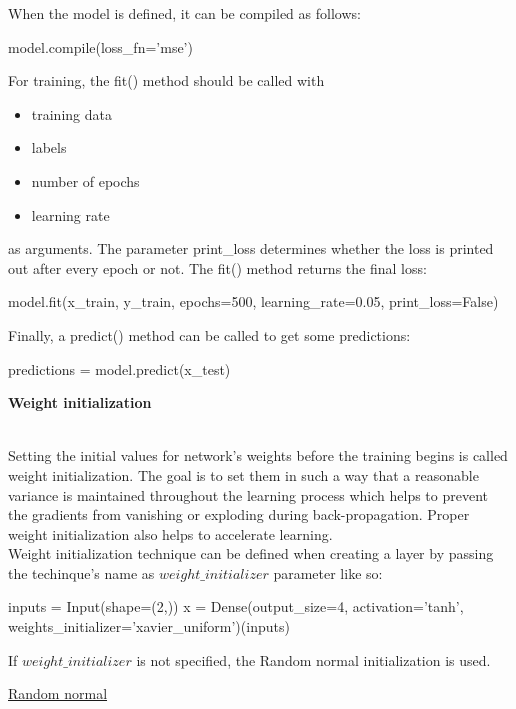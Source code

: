 \documentclass{article}
\begin{document}
When the model is defined, it can be compiled as follows:
\begin{python}
model.compile(loss_fn='mse')
\end{python}

For training, the fit() method should be called with 
\begin{itemize}
    \item training data
    \item labels 
    \item number of epochs
    \item learning rate
\end{itemize}
as arguments. The parameter print\_loss determines whether the loss is printed out 
after every epoch or not. The fit() method returns the final loss:
\begin{python}
model.fit(x_train,
          y_train,
          epochs=500,
          learning_rate=0.05,
          print_loss=False)
\end{python}
Finally, a predict() method can be called to get some predictions:
\begin{python}
predictions = model.predict(x_test)
\end{python}
    \clearpage
    
\hypertarget{weight_initialization}{\textbf{Weight initialization}} \\

Setting the initial values for network's weights before the training begins is called weight 
initialization. The goal is to set them in such a way that a reasonable variance is maintained throughout 
the learning process which helps to prevent the gradients from vanishing or exploding during back-propagation. 
Proper weight initialization also helps to accelerate learning. \\

Weight initialization technique can be defined when creating a layer by passing 
the techinque's name as $weight\_initializer$ parameter like so:
\begin{python}
inputs = Input(shape=(2,))
x = Dense(output_size=4,
          activation='tanh',
          weights_initializer='xavier_uniform')(inputs)
\end{python}

If $weight\_initializer$ is not specified, the Random normal initialization is used.
\pagebreak

\hypertarget{initialization_random_normal}{\underline{Random normal}} \\
\end{document}
